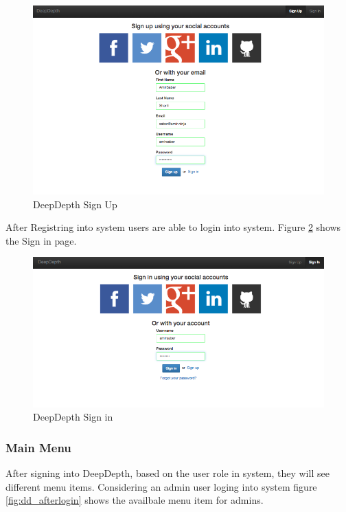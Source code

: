\documentclass[a4paper,11pt]{report}
\begin{document}
\begin{figure}[H!]
\begin{center}
\includegraphics[scale=0.5]{dd_register.png}
\end{center}
\caption{DeepDepth Sign Up}
\label{fig:dd_register}
\end{figure}

After Registring into system users are able to login into system. Figure \ref{fig:dd_login} shows the Sign in page.

\begin{figure}[H!]
\begin{center}
\includegraphics[scale=0.5]{dd_login.png}
\end{center}
\caption{DeepDepth Sign in}
\label{fig:dd_login}
\end{figure}

\subsubsection{Main Menu}

After signing into DeepDepth, based on the user role in system, they will see different menu items. Considering an admin user loging into system figure \ref{fig:dd_afterlogin} shows the availbale menu item for admins.
\end{document}
